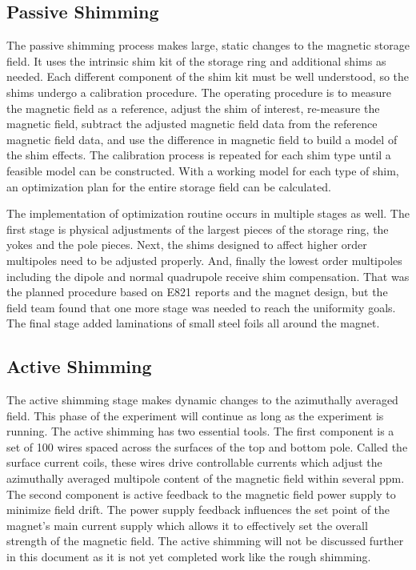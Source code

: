 \subsection{Passive Shimming}
The passive shimming process makes large, static changes to the magnetic storage field.  It uses the intrinsic shim kit of the storage ring and additional shims as needed. Each different component of the shim kit must be well understood, so the shims undergo a calibration procedure.  The operating procedure is to measure the magnetic field as a reference, adjust the shim of interest, re-measure the magnetic field, subtract the adjusted magnetic field data from the reference magnetic field data, and use the difference in magnetic field to build a model of the shim effects.  The calibration process is repeated for each shim type until a feasible model can be constructed.  With a working model for each type of shim, an optimization plan for the entire storage field can be calculated.

The implementation of optimization routine occurs in multiple stages as well.  The first stage is physical adjustments of the largest pieces of the storage ring, the yokes and the pole pieces.  Next, the shims designed to affect higher order multipoles need to be adjusted properly.  And, finally the lowest order multipoles including the dipole and normal quadrupole receive shim compensation.  That was the planned procedure based on E821 reports and the magnet design, but the field team found that one more stage was needed to reach the uniformity goals.  The final stage added laminations of small steel foils all around the magnet.

\subsection{Active Shimming}
The active shimming stage makes dynamic changes to the azimuthally averaged field.  This phase of the experiment will continue as long as the experiment is running.  The active shimming has two essential tools.  The first component is a set of 100 wires spaced across the surfaces of the top and bottom pole.  Called the surface current coils, these wires drive controllable currents which adjust the azimuthally averaged multipole content of the magnetic field within several ppm.  The second component is active feedback to the magnetic field power supply to minimize field drift.  The power supply feedback influences the set point of the magnet's main current supply which allows it to effectively set the overall strength of the magnetic field.  The active shimming will not be discussed further in this document as it is not yet completed work like the rough shimming.

